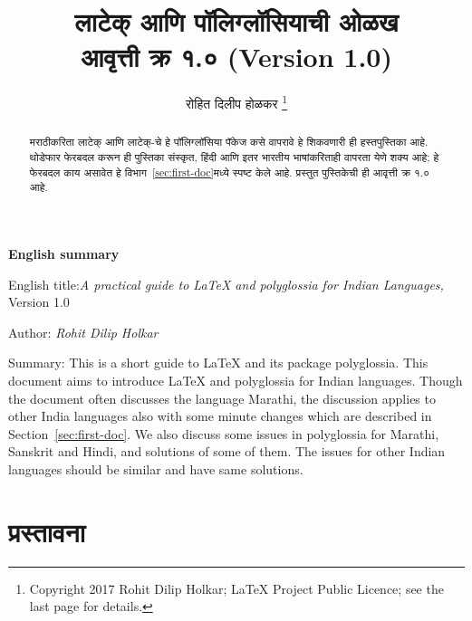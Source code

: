 \documentclass[11pt]{article}
\newcommand{\7}{\textbackslash}
\begin{document}
\thispagestyle{empty}

\title{लाटेक् आणि पॉलिग्लॉसियाची ओळख\\ {\small आवृत्ती क्र १.० ({\Bask Version 1.0})}}
\author{रोहित दिलीप होळकर \thanks{\Bask Copyright {\textcopyright} \@
 2017 Rohit Dilip Holkar; LaTeX Project Public Licence; see the last page for details.}}
 \date{}
\maketitle

\begin{abstract}
मराठीकरिता लाटेक् आणि लाटेक्-चे हे पॉलिग्लॉसिया पॅकेज कसे वापरावे हे शिकवणारी ही
हस्तपुस्तिका आहे. थोडेफार फेरबदल करून ही पुस्तिका संस्कृत, हिंदी आणि इतर भारतीय
भाषांकरिताही वापरता येणे शक्य आहे; हे फेरबदल काय असावेत हे
विभाग~\ref{sec:first-doc}मध्ये स्पष्ट केले आहे. प्रस्तुत पुस्तिकेची ही आवृत्ती क्र १.० आहे. 
\end{abstract}
\vspace{0.5in}

\begin{center}
{\Bask \bfseries English summary}
\medskip

 {\Bask English title:{\itshape A practical guide to {\LaTeX} and
     polyglossia for Indian Languages,} Version 1.0
\smallskip

Author: {\itshape Rohit Dilip Holkar}
\smallskip

 Summary:{ This is a short guide to {\LaTeX} and its package
 polyglossia. This document aims to introduce {\LaTeX} and
 polyglossia for Indian languages. Though the document often
 discusses the language Marathi, the discussion applies to other India languages also with some minute changes which are described in Section~\ref{sec:first-doc}. We also discuss some issues in polyglossia for Marathi, Sanskrit and Hindi, and solutions of some of them. The issues for other Indian languages should be similar and have same solutions.}}
\end{center}

\newpage

\thispagestyle{empty}

\tableofcontents{}

\newpage

\thispagestyle{empty}

\section*{प्रस्तावना}
\end{document}

